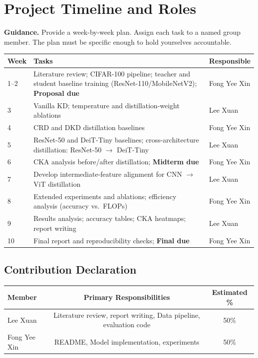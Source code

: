 \documentclass[11pt, letterpaper]{article}
\begin{document}
\section{Project Timeline and Roles}

\begin{guidancebox}
\textbf{Guidance.} Provide a week-by-week plan. Assign each task to a named
group member. The plan must be specific enough to hold yourselves accountable.
\end{guidancebox}

\begin{center}
\begin{tabular}{lp{7cm}l}
\toprule
\textbf{Week} & \textbf{Tasks} & \textbf{Responsible} \\
\midrule
1--2 & Literature review; CIFAR-100 pipeline; teacher and student baseline training (ResNet-110/MobileNetV2); \textbf{Proposal due} & Fong Yee Xin \\
3 & Vanilla KD; temperature and distillation-weight ablations & Lee Xuan \\
4 & CRD and DKD distillation baselines & Fong Yee Xin \\
5 & ResNet-50 and DeiT-Tiny baselines; cross-architecture distillation: ResNet-50 $\rightarrow$ DeiT-Tiny & Lee Xuan \\
6 & CKA analysis before/after distillation; \textbf{Midterm due} & Fong Yee Xin \\
7 & Develop intermediate-feature alignment for CNN $\rightarrow$ ViT distillation & Lee Xuan \\
8 & Extended experiments and ablations; efficiency analysis (accuracy vs.\ FLOPs) & Fong Yee Xin \\
9 & Results analysis; accuracy tables; CKA heatmaps; report writing & Lee Xuan \\
10 & Final report and reproducibility checks; \textbf{Final due} & Fong Yee Xin \\
\bottomrule
\end{tabular}
\end{center}

\subsection{Contribution Declaration}

\begin{tabular}{lcc}
\toprule
\textbf{Member} & \textbf{Primary Responsibilities} & \textbf{Estimated \%} \\
\midrule
{Lee Xuan} & Literature review, report writing, Data pipeline, evaluation code & 50\%  \\
{Fong Yee Xin}& README, Model implementation, experiments & 50\%  \\
\bottomrule
\end{tabular}
\end{document}
